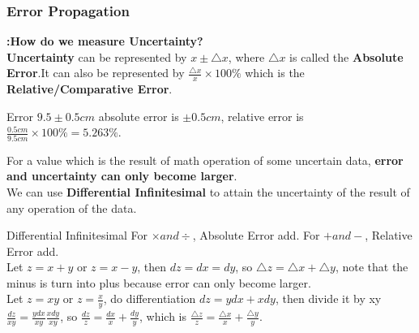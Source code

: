 \subsubsection{Error Propagation}
\textbf{:How do we measure Uncertainty?}\\

\textbf{Uncertainty} can be represented by \( x \pm \triangle x \), where \(\triangle x\) is called the \textbf{Absolute Error}.It can also be represented by \( \frac {\triangle x}{x} \times 100 \% \)  which is the \textbf{Relative/Comparative Error}.\\

\begin{examplebox}{Error}
\(9.5 \pm 0.5 cm\) absolute error is \(\pm 0.5 cm\), relative error is \(\frac{0.5 cm}{9.5 cm} \times 100 \% = 5.263 \% \).
\end{examplebox}
\vspace{0.5cm}

For a value which is the result of math operation of some uncertain data, \textbf{error and uncertainty can only become larger}.\\ We can use \textbf{Differential Infinitesimal} to attain the uncertainty of the result of any operation of the data. \\

\begin{examplebox}{Differential Infinitesimal}
For \( \times and \div \), Absolute Error add. For \( + and - \), Relative Error add.\\ Let \(z=x+y\) or \(z=x-y\), then \(dz=dx=dy\), so \(\triangle z=\triangle x+\triangle y\), note that the minus is turn into plus because error can only become larger.\\ Let \(z=xy\) or \(z=\frac{x}{y}\), do differentiation \(dz=ydx+xdy\), then divide it by xy \(\frac{dz}{xy}=\frac{ydx}{xy} \frac{xdy}{xy}\), so \(\frac{dz}{z}=\frac{dx}{x} +\frac{dy}{y}\), which is \(\frac{\triangle z}{z}=\frac{\triangle x}{x} +\frac{\triangle y}{y}\).
\end{examplebox}

